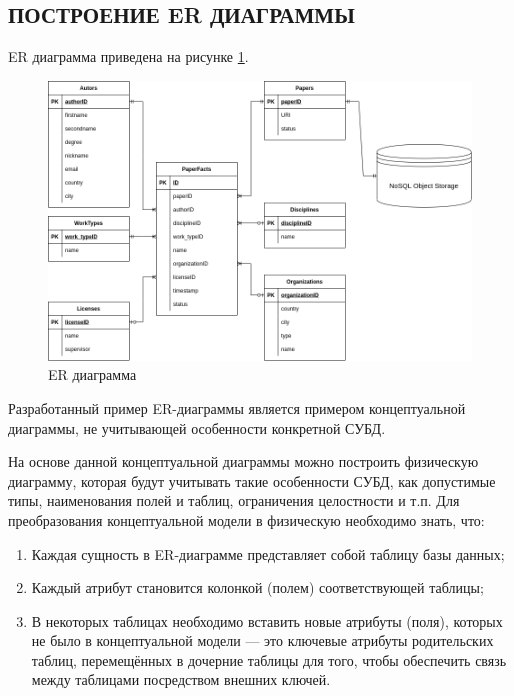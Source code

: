 \documentclass[a4paper,14pt]{extarticle}
\begin{document}
\subsection{ПОСТРОЕНИЕ ER ДИАГРАММЫ}

ER диаграмма приведена на рисунке \ref{fig:data-model}.

\begin{figure}[h!]
	\centering
	\includegraphics[width=0.8\linewidth]{images/data-model}
	\caption{ER диаграмма}
	\label{fig:data-model}
\end{figure}


Разработанный пример ER-диаграммы является примером
концептуальной диаграммы, не учитывающей особенности конкретной
СУБД. 

На основе данной концептуальной диаграммы можно построить
физическую диаграмму, которая будут учитывать такие особенности СУБД,
как допустимые типы, наименования полей и таблиц, ограничения
целостности и т.п.
Для преобразования концептуальной модели в физическую необходимо
знать, что:
\begin{enumerate}
	\item Каждая сущность в ER-диаграмме представляет собой таблицу
	базы данных;
	\item Каждый атрибут становится колонкой (полем) соответствующей
	таблицы;
	\item  В некоторых таблицах необходимо вставить новые атрибуты
	(поля), которых не было в концептуальной модели — это ключевые атрибуты 
	родительских таблиц, перемещённых в дочерние таблицы для того, чтобы
	обеспечить связь между таблицами посредством внешних ключей.
\end{enumerate}

%
\end{document}
